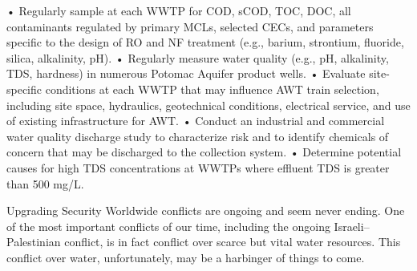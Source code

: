 \documentclass{article}
\begin{document}
• Regularly sample at each WWTP for COD, sCOD, TOC, DOC, all
contaminants regulated by primary MCLs, selected CECs, and parameters
specific to the design of RO and NF treatment (e.g., barium, strontium,
fluoride, silica, alkalinity, pH). • Regularly measure water quality
(e.g., pH, alkalinity, TDS, hardness) in numerous Potomac Aquifer
product wells. • Evaluate site-specific conditions at each WWTP that may
influence AWT train selection, including site space, hydraulics,
geotechnical conditions, electrical service, and use of existing
infrastructure for AWT. • Conduct an industrial and commercial water
quality discharge study to characterize risk and to identify chemicals
of concern that may be discharged to the collection system. • Determine
potential causes for high TDS concentrations at WWTPs where effluent TDS
is greater than 500 mg/L.

Upgrading Security Worldwide conflicts are ongoing and seem never
ending. One of the most important conflicts of our time, including the
ongoing Israeli--Palestinian conflict, is in fact conflict over scarce
but vital water resources. This conflict over water, unfortunately, may
be a harbinger of things to come.
\end{document}
